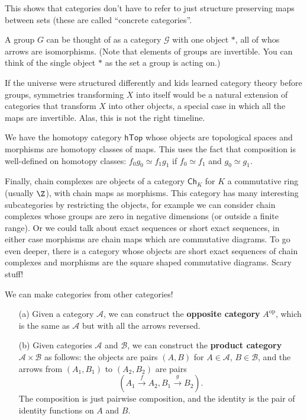 This shows that categories don't have to refer to just structure preserving maps between sets (these are called ``concrete categories''.
\begin{example}
    A group $G $ can be thought of as a category $\mathcal{G} $ with one object $*$, all of whos arrows are isomorphisms. (Note that elements of groups are invertible. You can think of the single object $*$ as the set a group is acting on.)

            If the universe were structured differently and kids learned category theory before groups, symmetries transforming $X$ into itself would be a natural extension of categories that transform $X$ into other objects, a special case in which all the maps are invertible. Alas, this is not the right timeline.
\end{example}

\begin{example}
    We have the homotopy category $\mathsf{hTop} $ whose objects are topological spaces and morphisms are homotopy classes of maps. This uses the fact that composition is well-defined on homotopy classes: $f_0g_0 \simeq f_1g_1$ if $f_0 \simeq f_1$ and $g_0 \simeq g_1$.
\end{example}

\begin{example}
    Finally, chain complexes are objects of a category $\mathsf{Ch} _K$ for $K$ a commutative ring (usually $\Z$), with chain maps as morphisms. This category has many interesting subcategories by restricting the objects, for example we can consider chain complexes whose groups are zero in negative dimensions (or outside a finite range). Or we could talk about exact sequences or short exact sequences, in either case morphisms are chain maps which are commutative diagrams. To go even deeper, there is a category whose objects are short exact sequences of chain complexes and morphisms are the square shaped commutative diagrams. Scary stuff!
\end{example}
\begin{example}
We can make categories from other categories!
   \begin{enumerate}
       \item[(a)] Given a category $\mathcal{A} $, we can construct the \textbf{opposite category} $A^{\text{op}}$, which is the same as $\mathcal{A} $ but with all the arrows reversed.
       \item[(b)] Given categories $\mathcal{A} $ and $\mathcal{B} $, we can construct the \textbf{product category}  $\mathcal{A} \times \mathcal{B} $ as follows: the objects are pairs $(A,B)$ for $A\in \mathcal{A} $, $B\in \mathcal{B} $, and the arrows from $(A_1,B_1)$ to $(A_2,B_2)$ are pairs \[
               \left( A_1 \overset{f}{\to }A_2, B_1\overset{g}{\to }B_2 \right) .
       \] The composition is just pairwise composition, and the identity is the pair of identity functions on $A$ and $B$.
   \end{enumerate} 
\end{example}

